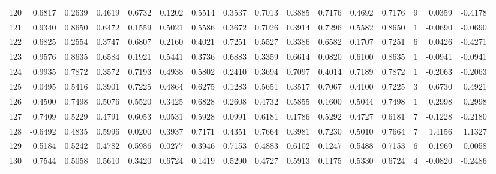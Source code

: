 \begin{tabular}{lrrrrrrrrrrrrrrr}
120 &      0.6817 &  0.2639 &  0.4619 &  0.6732 &  0.1202 &  0.5514 &  0.3537 &  0.7013 &  0.3885 &  0.7176 &   0.4692 &     0.7176 &      9 &                    0.0359 &                    -0.4178 \\
121 &      0.9340 &  0.8650 &  0.6472 &  0.1559 &  0.5021 &  0.5586 &  0.3672 &  0.7026 &  0.3914 &  0.7296 &   0.5582 &     0.8650 &      1 &                   -0.0690 &                    -0.0690 \\
122 &      0.6825 &  0.2554 &  0.3747 &  0.6807 &  0.2160 &  0.4021 &  0.7251 &  0.5527 &  0.3386 &  0.6582 &   0.1707 &     0.7251 &      6 &                    0.0426 &                    -0.4271 \\
123 &      0.9576 &  0.8635 &  0.6584 &  0.1921 &  0.5441 &  0.3736 &  0.6883 &  0.3359 &  0.6614 &  0.0820 &   0.6100 &     0.8635 &      1 &                   -0.0941 &                    -0.0941 \\
124 &      0.9935 &  0.7872 &  0.3572 &  0.7193 &  0.4938 &  0.5802 &  0.2410 &  0.3694 &  0.7097 &  0.4014 &   0.7189 &     0.7872 &      1 &                   -0.2063 &                    -0.2063 \\
125 &      0.0495 &  0.5416 &  0.3901 &  0.7225 &  0.4864 &  0.6275 &  0.1283 &  0.5651 &  0.3517 &  0.7067 &   0.4100 &     0.7225 &      3 &                    0.6730 &                     0.4921 \\
126 &      0.4500 &  0.7498 &  0.5076 &  0.5520 &  0.3425 &  0.6828 &  0.2608 &  0.4732 &  0.5855 &  0.1600 &   0.5044 &     0.7498 &      1 &                    0.2998 &                     0.2998 \\
127 &      0.7409 &  0.5229 &  0.4791 &  0.6053 &  0.0531 &  0.5928 &  0.0991 &  0.6181 &  0.1786 &  0.5292 &   0.4727 &     0.6181 &      7 &                   -0.1228 &                    -0.2180 \\
128 &     -0.6492 &  0.4835 &  0.5996 &  0.0200 &  0.3937 &  0.7171 &  0.4351 &  0.7664 &  0.3981 &  0.7230 &   0.5010 &     0.7664 &      7 &                    1.4156 &                     1.1327 \\
129 &      0.5184 &  0.5242 &  0.4782 &  0.5986 &  0.0277 &  0.3946 &  0.7153 &  0.4883 &  0.6102 &  0.1247 &   0.5488 &     0.7153 &      6 &                    0.1969 &                     0.0058 \\
130 &      0.7544 &  0.5058 &  0.5610 &  0.3420 &  0.6724 &  0.1419 &  0.5290 &  0.4727 &  0.5913 &  0.1175 &   0.5330 &     0.6724 &      4 &                   -0.0820 &                    -0.2486 \\

\end{tabular}
